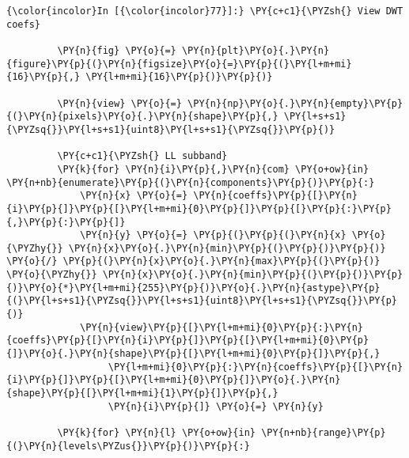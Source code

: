     \begin{Verbatim}[commandchars=\\\{\}]
{\color{incolor}In [{\color{incolor}77}]:} \PY{c+c1}{\PYZsh{} View DWT coefs}
         
         \PY{n}{fig} \PY{o}{=} \PY{n}{plt}\PY{o}{.}\PY{n}{figure}\PY{p}{(}\PY{n}{figsize}\PY{o}{=}\PY{p}{(}\PY{l+m+mi}{16}\PY{p}{,} \PY{l+m+mi}{16}\PY{p}{)}\PY{p}{)}
         
         \PY{n}{view} \PY{o}{=} \PY{n}{np}\PY{o}{.}\PY{n}{empty}\PY{p}{(}\PY{n}{pixels}\PY{o}{.}\PY{n}{shape}\PY{p}{,} \PY{l+s+s1}{\PYZsq{}}\PY{l+s+s1}{uint8}\PY{l+s+s1}{\PYZsq{}}\PY{p}{)}
         
         \PY{c+c1}{\PYZsh{} LL subband}
         \PY{k}{for} \PY{n}{i}\PY{p}{,}\PY{n}{com} \PY{o+ow}{in} \PY{n+nb}{enumerate}\PY{p}{(}\PY{n}{components}\PY{p}{)}\PY{p}{:}
             \PY{n}{x} \PY{o}{=} \PY{n}{coeffs}\PY{p}{[}\PY{n}{i}\PY{p}{]}\PY{p}{[}\PY{l+m+mi}{0}\PY{p}{]}\PY{p}{[}\PY{p}{:}\PY{p}{,}\PY{p}{:}\PY{p}{]}
             \PY{n}{y} \PY{o}{=} \PY{p}{(}\PY{p}{(}\PY{n}{x} \PY{o}{\PYZhy{}} \PY{n}{x}\PY{o}{.}\PY{n}{min}\PY{p}{(}\PY{p}{)}\PY{p}{)} \PY{o}{/} \PY{p}{(}\PY{n}{x}\PY{o}{.}\PY{n}{max}\PY{p}{(}\PY{p}{)} \PY{o}{\PYZhy{}} \PY{n}{x}\PY{o}{.}\PY{n}{min}\PY{p}{(}\PY{p}{)}\PY{p}{)}\PY{o}{*}\PY{l+m+mi}{255}\PY{p}{)}\PY{o}{.}\PY{n}{astype}\PY{p}{(}\PY{l+s+s1}{\PYZsq{}}\PY{l+s+s1}{uint8}\PY{l+s+s1}{\PYZsq{}}\PY{p}{)}
             \PY{n}{view}\PY{p}{[}\PY{l+m+mi}{0}\PY{p}{:}\PY{n}{coeffs}\PY{p}{[}\PY{n}{i}\PY{p}{]}\PY{p}{[}\PY{l+m+mi}{0}\PY{p}{]}\PY{o}{.}\PY{n}{shape}\PY{p}{[}\PY{l+m+mi}{0}\PY{p}{]}\PY{p}{,}
                  \PY{l+m+mi}{0}\PY{p}{:}\PY{n}{coeffs}\PY{p}{[}\PY{n}{i}\PY{p}{]}\PY{p}{[}\PY{l+m+mi}{0}\PY{p}{]}\PY{o}{.}\PY{n}{shape}\PY{p}{[}\PY{l+m+mi}{1}\PY{p}{]}\PY{p}{,}
                  \PY{n}{i}\PY{p}{]} \PY{o}{=} \PY{n}{y}
         
         \PY{k}{for} \PY{n}{l} \PY{o+ow}{in} \PY{n+nb}{range}\PY{p}{(}\PY{n}{levels\PYZus{}}\PY{p}{)}\PY{p}{:}
         

\end{Verbatim}
